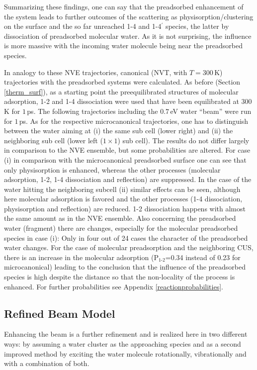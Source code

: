 \documentclass[11pt,DIV=13,BCOR=5mm,a4paper,headinclude]{scrbook}
\begin{document}
Summarizing these findings, one can say that the preadsorbed enhancement of the system leads to further outcomes of the scattering as physisorption/clustering on the surface and the so far unreached 1-4 and 1-4$^\prime$ species, the latter by dissociation of preadsorbed molecular water.
As it is not surprising, the influence is more massive with the incoming water molecule being near the preadsorbed species.


In analogy to these NVE trajectories, canonical (NVT, with $T=300\,$K) trajectories with the preadsorbed systems were calculated.
As before (Section \ref{therm_surf}), as a starting point the preequilibrated structures of molecular adsorption, 1-2 and 1-4 dissociation were used that have been equilibrated at $300\,$K for $1\,$ps.
The following trajectories including the $0.7\,$eV water ``beam'' were run for $1\,$ps.
As for the respective microcanonical trajectories, one has to distinguish between the water aiming at (i) the same sub cell (lower right) and (ii) the neighboring sub cell (lower left ($1\times 1$) sub cell).
The results do not differ largely in comparison to the NVE ensemble, but some probabilities are altered.
For case (i) in comparison with the microcanonical preadsorbed surface one can see that only physisorption is enhanced, whereas the other processes (molecular adsorption, 1-2, 1-4 dissociation and reflection) are suppressed.
In the case of the water hitting the neighboring subcell (ii) similar effects can be seen, although here molecular adsorption is favored and the other processes (1-4 dissociation, physisorption and reflection) are reduced.
1-2 dissociation happens with almost the same amount as in the NVE ensemble.
Also concerning the preadsorbed water (fragment) there are changes, especially for the molecular preadsorbed species in case (i): Only in four out of 24 cases the character of the preadsorbed water changes.
For the case of molecular preadsorption and the neighboring CUS, there is an increase in the molecular adsorption (P$_\textrm{1-2}$=0.34 instead of 0.23 for microcanonical) leading to the conclusion that the influence of the preadsorbed species is high despite the distance so that the non-locality of the process is enhanced.
For further probabilities see Appendix \ref{reactionprobabilities}.

\subsection{Refined Beam Model}\label{refinedbeam}
Enhancing the beam is a further refinement and is realized here in two different ways: by assuming a water cluster as the approaching species and as a second improved method by exciting the water molecule rotationally, vibrationally and with a combination of both.
\end{document}
